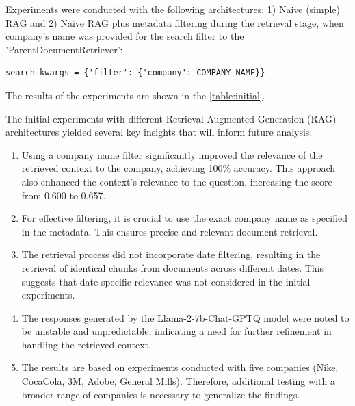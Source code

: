 Experiments were conducted with the following architectures: 1) Naive (simple) RAG and 2) Naive RAG plus metadata filtering during the retrieval stage, when company's name was provided for the search filter to the 'ParentDocumentRetriever':
\begin{verbatim}
search_kwargs = {'filter': {'company': COMPANY_NAME}}
\end{verbatim}
The results of the experiments are shown in the \autoref{table:initial}.\\ 

\begin{table}[h!]
\centering
{}
\caption{Results of the initial experiments}
\label{table:initial}
\end{table}

The initial experiments with different Retrieval-Augmented Generation (RAG) architectures yielded several key insights that will inform future analysis:
\begin{enumerate}
\item Using a company name filter significantly improved the relevance of the retrieved context to the company, achieving 100\% accuracy. This approach also enhanced the context's relevance to the question, increasing the score from 0.600 to 0.657.
\item For effective filtering, it is crucial to use the exact company name as specified in the metadata. This ensures precise and relevant document retrieval.
\item The retrieval process did not incorporate date filtering, resulting in the retrieval of identical chunks from documents across different dates. This suggests that date-specific relevance was not considered in the initial experiments.
\item The responses generated by the Llama-2-7b-Chat-GPTQ model were noted to be unstable and unpredictable, indicating a need for further refinement in handling the retrieved context.
\item The results are based on experiments conducted with five companies (Nike, CocaCola, 3M, Adobe, General Mills). Therefore, additional testing with a broader range of companies is necessary to generalize the findings.
\end{enumerate}


